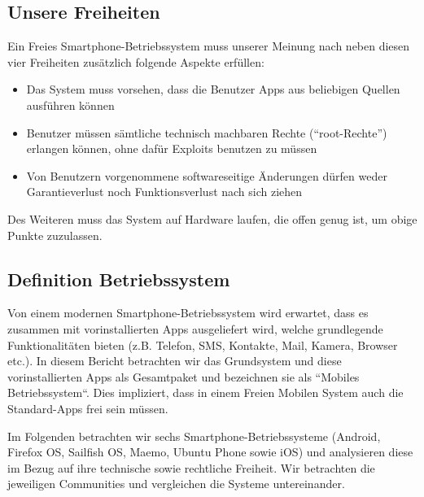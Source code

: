 \subsection{Unsere Freiheiten}
Ein Freies Smartphone-Betriebssystem muss unserer Meinung nach neben diesen vier Freiheiten zusätzlich folgende Aspekte erfüllen:
\begin{itemize}
	\renewcommand\labelitemi{--}
	\item Das System muss vorsehen, dass die Benutzer Apps aus beliebigen Quellen ausführen können
	\item Benutzer müssen sämtliche technisch machbaren Rechte (\mbox{``root-Rechte''}) erlangen können, ohne dafür Exploits benutzen zu müssen
	\item Von Benutzern vorgenommene softwareseitige Änderungen dürfen weder Garantieverlust noch Funktionsverlust nach sich ziehen
\end{itemize}
Des Weiteren muss das System auf Hardware laufen, die offen genug ist, um obige Punkte zuzulassen.
\newline

\subsection{Definition Betriebssystem}
Von einem modernen Smartphone-Betriebssystem wird erwartet, dass es zusammen mit vorinstallierten Apps ausgeliefert wird, welche grundlegende Funktionalitäten bieten (z.B. Telefon, SMS, Kontakte, Mail, Kamera, Browser etc.). In diesem Bericht betrachten wir das Grundsystem und diese vorinstallierten Apps als Gesamtpaket und bezeichnen sie als ``Mobiles Betriebssystem“. Dies impliziert, dass in einem Freien Mobilen System auch die Standard-Apps frei sein müssen.
\newline

Im Folgenden betrachten wir sechs Smartphone-Betriebssysteme (Android, Firefox OS, Sailfish OS, Maemo, Ubuntu Phone sowie iOS) und analysieren diese im Bezug auf ihre technische sowie rechtliche Freiheit. Wir betrachten die jeweiligen Communities und vergleichen die Systeme untereinander.